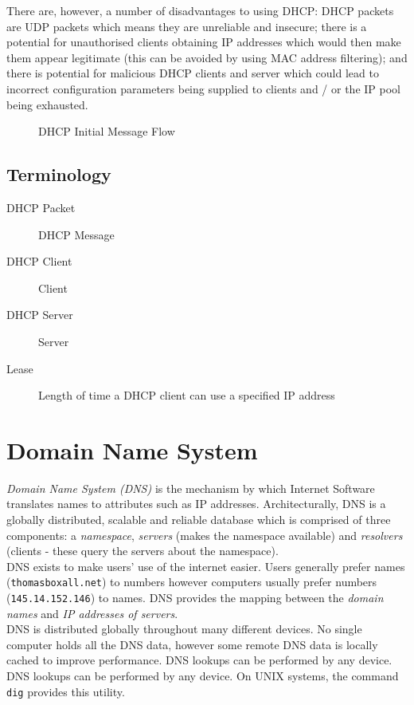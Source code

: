 There are, however, a number of disadvantages to using DHCP: DHCP packets are UDP packets which means they are unreliable and insecure; there is a potential for unauthorised clients obtaining IP addresses which would then make them appear legitimate (this can be avoided by using MAC address filtering); and there is potential for malicious DHCP clients and server which could lead to incorrect configuration parameters being supplied to clients and / or the IP pool being exhausted.\\

\begin{figure}[h]
    \centering
    
    \caption{DHCP Initial Message Flow}
\end{figure}

\subsection{Terminology}
\begin{description}
    \item[DHCP Packet] DHCP Message
    \item[DHCP Client] Client
    \item[DHCP Server] Server
    \item[Lease] Length of time a DHCP client can use a specified IP address
\end{description}

\section{Domain Name System}
\textit{Domain Name System (DNS)} is the mechanism by which Internet Software translates names to attributes such as IP addresses. Architecturally, DNS is a globally distributed, scalable and reliable database which is comprised of three components: a \textit{namespace}, \textit{servers} (makes the namespace available) and \textit{resolvers} (clients - these query the servers about the namespace).\\

DNS exists to make users' use of the internet easier. Users generally prefer names (\verb|thomasboxall.net|) to numbers however computers usually prefer numbers (\verb|145.14.152.146|) to names. DNS provides the mapping between the \textit{domain names} and \textit{IP addresses of servers}. \\

DNS is distributed globally throughout many different devices. No single computer holds all the DNS data, however some remote DNS data is locally cached to improve performance. DNS lookups can be performed by any device. DNS lookups can be performed by any device. On UNIX systems, the command \verb|dig| provides this utility.\\

